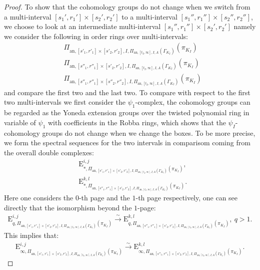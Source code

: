 \documentclass[12pt]{amsart}
\theoremstyle{definition}
\numberwithin{equation}{section}
\begin{document}
\begin{proof}
\indent To show that the cohomology groups do not change when we switch from a multi-interval $[s_1',r_1']\times [s_2',r_2']$ to a multi-interval $[s_1'',r_1'']\times [s_2'',r_2'']$, we choose to look at an intermediate multi-interval $[s_1'',r_1'']\times [s_2',r_2']$ namely we consider the following in order rings over multi-intervals:
\begin{align}
&\Pi_{\mathrm{an},[s'_1,r'_1]\times [s'_2,r'_2],I,\Pi_{\mathrm{an},[t_I,\infty],I,A}(\Gamma_{K_I})}(\pi_{K_I})\\
&\Pi_{\mathrm{an},[s''_1,r''_1]\times [s'_2,r'_2],I,\Pi_{\mathrm{an},[t_I,\infty],I,A}(\Gamma_{K_I})}(\pi_{K_I})\\
&\Pi_{\mathrm{an},[s''_1,r''_1]\times [s''_2,r''_2],I,\Pi_{\mathrm{an},[t_I,\infty],I,A}(\Gamma_{K_I})}(\pi_{K_I})	
\end{align}
and compare the first two and the last two. To compare with respect to the first two multi-intervals we first consider the $\psi_1$-complex, the cohomology groups can be regarded as the Yoneda extension groups over the twisted polynomial ring in variable of $\psi_1$ with coefficients in the Robba rings, which shows that the $\psi_I$-cohomology groups do not change when we change the boxes. To be more precise, we form the spectral sequences for the two intervals in comparisom coming from the overall double complexes:
\begin{align}
&\mathrm{E}^{i,j}_{*,\Pi_{\mathrm{an},[s'_1,r'_1]\times [s'_2,r'_2],I,\Pi_{\mathrm{an},[t_I,\infty],I,A}(\Gamma_{K_I})}(\pi_{K_I})},\\
&\mathrm{E}^{k,l}_{*,\Pi_{\mathrm{an},[s''_1,r''_1]\times [s'_2,r'_2],I,\Pi_{\mathrm{an},[t_I,\infty],I,A}(\Gamma_{K_I})}(\pi_{K_I})}.
\end{align}
Here one considers the $0$-th page and the $1$-th page respectively, one can see directly that the isomorphism beyond the $1$-page:
\begin{align}
\mathrm{E}^{i,j}_{q,\Pi_{\mathrm{an},[s'_1,r'_1]\times [s'_2,r'_2],I,\Pi_{\mathrm{an},[t_I,\infty],I,A}(\Gamma_{K_I})}(\pi_{K_I})}\overset{\sim}{\longrightarrow}\mathrm{E}^{k,l}_{q,\Pi_{\mathrm{an},[s''_1,r''_1]\times [s'_2,r'_2],I,\Pi_{\mathrm{an},[t_I,\infty],I,A}(\Gamma_{K_I})}(\pi_{K_I})},~q>1.
\end{align}
This implies that:
\begin{align}
\mathrm{E}^{i,j}_{\infty,\Pi_{\mathrm{an},[s'_1,r'_1]\times [s'_2,r'_2],I,\Pi_{\mathrm{an},[t_I,\infty],I,A}(\Gamma_{K_I})}(\pi_{K_I})}\overset{\sim}{\longrightarrow}\mathrm{E}^{k,l}_{\infty,\Pi_{\mathrm{an},[s''_1,r''_1]\times [s'_2,r'_2],I,\Pi_{\mathrm{an},[t_I,\infty],I,A}(\Gamma_{K_I})}(\pi_{K_I})}.

\end{align}
\end{proof}
\end{document}
